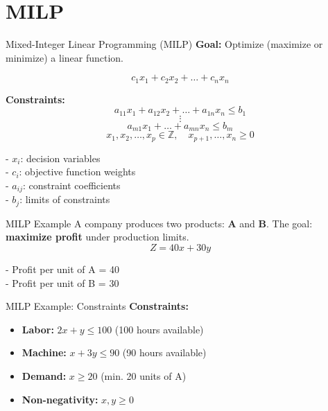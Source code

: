 \documentclass{beamer}
\begin{document}
\section{MILP}

\begin{frame}{Mixed-Integer Linear Programming (MILP)}
\textbf{Goal:} Optimize (maximize or minimize) a linear function.

\[
 c_1x_1 + c_2x_2 + \dots + c_nx_n
\]

\textbf{Constraints:}
\[
a_{11}x_1 + a_{12}x_2 + \dots + a_{1n}x_n \leq b_1
\]
\[
\vdots
\]
\[
a_{m1}x_1 + \dots + a_{mn}x_n \leq b_m
\]
\[
x_1, x_2, \dots, x_p \in \mathbb{Z}, 
\quad x_{p+1}, \dots, x_n \geq 0
\]

\bigskip
\small
- $x_i$: decision variables \\
- $c_i$: objective function weights \\
- $a_{ij}$: constraint coefficients \\
- $b_j$: limits of constraints
\end{frame}



\begin{frame}{MILP Example}
A company produces two products: \textbf{A} and \textbf{B}.  
The goal: \textbf{maximize profit} under production limits.\\


\[
Z = 40x + 30y
\]

\smallskip
- Profit per unit of A = 40 \\
- Profit per unit of B = 30
\end{frame}

\begin{frame}{MILP Example: Constraints}
\textbf{Constraints:}
\begin{itemize}
    \item \textbf{Labor: } $2x + y \leq 100$ \hfill (100 hours available)
    \item \textbf{Machine: } $x + 3y \leq 90$ \hfill (90 hours available)
    \item \textbf{Demand: } $x \geq 20$ \hfill (min. 20 units of A)
    \item \textbf{Non-negativity: } $x, y \geq 0$
\end{itemize}
\end{frame}
\end{document}
